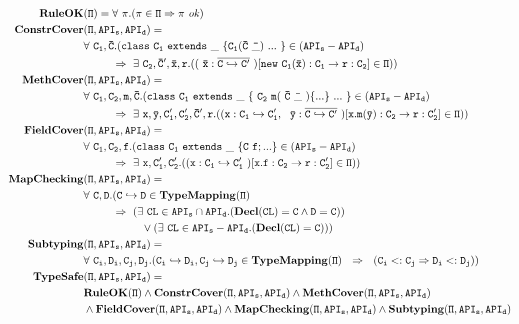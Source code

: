 \documentclass[letterpaper]{article}
\newcommand{\indentspace}{~~~~~~~~}
\begin{document}
\begin{align*}
\tt \mathbf{RuleOK} &\tt(\Pi) = \forall~\pi. (\pi\in\Pi \Rightarrow \pi~\mathit{ok})\\
\tt \mathbf{ConstrCover}&\tt(\Pi, API_s, API_d) =\\
                  &\tt \forall~C_1,\bar{C}. (class\ C_1\ extends\ \_~\{ C_1(\bar{C}\ \bar{\_})~...~\}\in (API_s-API_d) \\
                  &\tt \indentspace\Rightarrow~ \exists~C_2,\bar{C}',\bar{x},r.((~\bar{x}:\overline{C\hookrightarrow C'}~)[new\ C_1(\bar{x}):C_1\rightarrow r:C_2]\in\Pi))\\
\tt \mathbf{MethCover}&\tt(\Pi, API_s, API_d) =\\ 
                  &\tt \forall~C_1,C_2,m,\bar{C}.(class\ C_1\ extends\ \_~\{~C_2\ m(~\bar{C}\ \bar{\_}~)\{...\}~...~\}\in (API_s-API_d) \\
                  &\tt \indentspace\Rightarrow~ \exists~x,\bar{y},C'_1,C'_2,\bar{C}',r.((x:C_1\hookrightarrow C'_1,\ ~\bar{y}:\overline{C\hookrightarrow C'}~)[x.m(\bar{y}):C_2\rightarrow r:C'_2] \in \Pi))\\
\tt \mathbf{FieldCover}&\tt(\Pi, API_s, API_d) =\\ 
                  &\tt \forall~C_1,C_2,f.(class\ C_1\ extends\ \_~\{C\ f;...\}\in (API_s-API_d) \\
                  &\tt \indentspace \Rightarrow~ \exists~x,C'_1,C'_2.((x:C_1\hookrightarrow C'_1~)[x.f:C_2\rightarrow r:C'_2] \in \Pi))                           \\
\tt \mathbf{MapChecking}&\tt(\Pi, API_s, API_d) =\\
                  &\tt \forall~C,D.(C\hookrightarrow D\in \mathbf{TypeMapping}(\Pi)\\
                  &\tt \indentspace\Rightarrow~ (\exists~CL\in API_s \cap API_d. (\mathbf{Decl}(CL)=C \land D = C))\\
                  &\tt \indentspace\indentspace \lor (\exists~CL\in API_s-API_d. (\mathbf{Decl}(CL)=C)))\\
\tt \mathbf{Subtyping}&\tt(\Pi, API_s, API_d) = \\
                      &\tt\forall~C_i,D_i,C_j,D_j.( C_i\hookrightarrow D_i, C_j\hookrightarrow D_j \in \mathbf{TypeMapping}(\Pi) ~~\Rightarrow~~ (C_i <: C_j\Rightarrow D_i<:D_j))\\
\tt \mathbf{TypeSafe} &\tt(\Pi, API_s, API_d) = \\
                      &\tt \mathbf{RuleOK}(\Pi) \land \mathbf{ConstrCover}(\Pi, API_s, API_d) \land \mathbf{MethCover}(\Pi, API_s, API_d)\\
                      &\tt \land \mathbf{FieldCover}(\Pi, API_s, API_d) \land \mathbf{MapChecking}(\Pi, API_s, API_d) \land \mathbf{Subtyping}(\Pi, API_s, API_d)
\end{align*}
\end{document}

